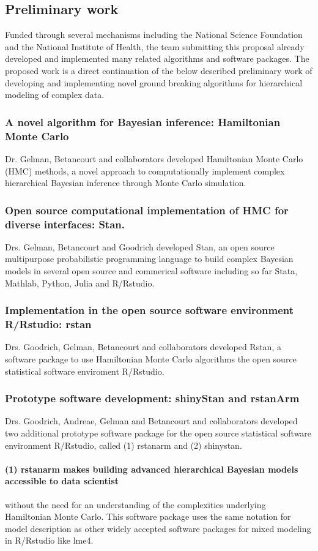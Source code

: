 \documentclass[11pt,notitlepage]{article}
\begin{document}
\subsection*{Preliminary work}
Funded through several mechanisms including the National Science Foundation and the National Institute of Health, the team submitting this proposal already developed and implemented many related algorithms and software packages. The proposed work is a direct continuation of the below described preliminary work of developing and implementing novel ground breaking algorithms for hierarchical modeling of complex data.
\subsubsection*{A novel algorithm for Bayesian inference: Hamiltonian Monte Carlo}
Dr. Gelman, Betancourt and collaborators developed Hamiltonian Monte Carlo (HMC) methods, a novel approach to computationally implement complex hierarchical Bayesian inference through Monte Carlo simulation. 
\subsubsection*{Open source computational implementation of HMC for diverse interfaces: Stan.} Drs. Gelman, Betancourt and Goodrich developed Stan, an open source multipurpose probabilistic programming language to build complex Bayesian models in several open source and commerical software including so far Stata, Mathlab, Python, Julia and R/Rstudio.  
\subsubsection*{Implementation in the open source software environment R/Rstudio: rstan} Drs. Goodrich, Gelman, Betancourt and collaborators developed Rstan, a software package to use Hamiltonian Monte Carlo algorithms the open source statistical software enviroment R/Rstudio.
\subsubsection*{Prototype software development: shinyStan and rstanArm} Drs. Goodrich, Andreae, Gelman and Betancourt and collaborators developed two additional prototype software package for the open source statistical software environment R/Rstudio, called (1) rstanarm and (2) shinystan.

\paragraph*{(1) rstanarm makes building advanced hierarchical Bayesian models accessible to data scientist} without the need for an understanding of the complexities underlying Hamiltonian Monte Carlo. This software package uses the same notation for model description as other widely accepted software packages for mixed modeling in R/Rstudio like lme4. 
\end{document}

